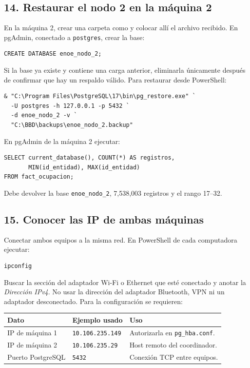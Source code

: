 \documentclass[12pt,letterpaper]{article}
\newcommand{\ruta}[1]{\texttt{\detokenize{#1}}}
\begin{document}
\subsection{14. Restaurar el nodo 2 en la máquina 2}

En la máquina 2, crear una carpeta como \ruta{C:/BBD/backups} y colocar allí el
archivo recibido. En pgAdmin, conectado a \texttt{postgres}, crear la base:

\begin{lstlisting}
CREATE DATABASE enoe_nodo_2;
\end{lstlisting}

Si la base ya existe y contiene una carga anterior, eliminarla únicamente
después de confirmar que hay un respaldo válido. Para restaurar desde
PowerShell:

\begin{lstlisting}
& "C:\Program Files\PostgreSQL\17\bin\pg_restore.exe" `
  -U postgres -h 127.0.0.1 -p 5432 `
  -d enoe_nodo_2 -v `
  "C:\BBD\backups\enoe_nodo_2.backup"
\end{lstlisting}

En pgAdmin de la máquina 2 ejecutar:

\begin{lstlisting}
SELECT current_database(), COUNT(*) AS registros,
       MIN(id_entidad), MAX(id_entidad)
FROM fact_ocupacion;
\end{lstlisting}

Debe devolver la base \texttt{enoe\_nodo\_2}, 7,538,003 registros y el rango
17--32.

\subsection{15. Conocer las IP de ambas máquinas}

Conectar ambos equipos a la misma red. En PowerShell de cada computadora
ejecutar:

\begin{lstlisting}
ipconfig
\end{lstlisting}

Buscar la sección del adaptador Wi-Fi o Ethernet que esté conectado y anotar
la \textit{Dirección IPv4}. No usar la dirección del adaptador Bluetooth,
VPN ni un adaptador desconectado. Para la configuración se requieren:

\begin{center}
\begin{tabular}{lll}
\toprule
\textbf{Dato} & \textbf{Ejemplo usado} & \textbf{Uso} \\
\midrule
IP de máquina 1 & \texttt{10.106.235.149} &
Autorizarla en \texttt{pg\_hba.conf}. \\
IP de máquina 2 & \texttt{10.106.235.29} &
Host remoto del coordinador. \\
Puerto PostgreSQL & \texttt{5432} &
Conexión TCP entre equipos. \\
\bottomrule
\end{tabular}
\end{center}
\end{document}
